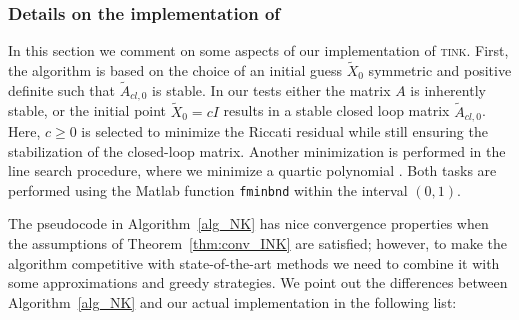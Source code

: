 \documentclass[a4paper,10pt]{article}
\newcommand{\upd}[1]{{\color{black}#1}} %
\begin{document}
\subsubsection{Details on the implementation of }
In this section we comment on some aspects of our implementation of \textsc{tink}. First, the algorithm is based on the choice of an initial guess $\tilde{X}_0$ symmetric and positive definite such that $\tilde{A}_{cl,0}$ is stable. In our tests either the matrix $A$ is inherently stable,  or the initial point $\tilde{X}_0 = c I$ results in a stable closed loop matrix $\tilde{A}_{cl,0}$. Here, $c\ge 0$  is selected to minimize the Riccati residual while still ensuring the stabilization of the closed-loop matrix. Another minimization is performed in the line search procedure, where we minimize a quartic polynomial \cite[equation 3.11]{benner2016inexact}. Both tasks are performed using the Matlab function \texttt{fminbnd} within the interval $(0,1)$.

The pseudocode in Algorithm~\ref{alg_NK} \upd{has} nice convergence properties when the assumptions of Theorem~\ref{thm:conv_INK} are satisfied; however, to make the algorithm competitive with state-of-the-art methods we need to combine it with some approximations and greedy strategies. We point out the differences between Algorithm~\ref{alg_NK} and our actual implementation in the following list:
\end{document}
